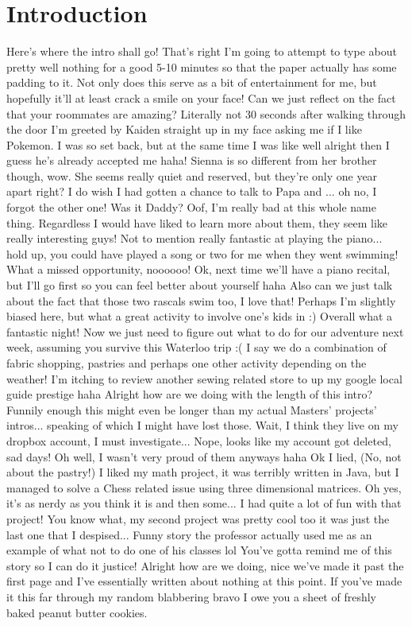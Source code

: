 \documentclass[]{article}
\begin{document}
\section{Introduction}
Here's where the intro shall go! That's right I'm going to attempt to type about pretty well nothing for a good 5-10 minutes so that the paper actually has some padding to it. Not only does this serve as a bit of entertainment for me, but hopefully it'll at least crack a smile on your face! Can we just reflect on the fact that your roommates are amazing? Literally not 30 seconds after walking through the door I'm greeted by Kaiden straight up in my face asking me if I like Pokemon. I was so set back, but at the same time I was like well alright then I guess he's already accepted me haha! Sienna is so different from her brother though, wow. She seems really quiet and reserved, but they're only one year apart right? I do wish I had gotten a chance to talk to Papa and ... oh no, I forgot the other one! Was it Daddy? Oof, I'm really bad at this whole name thing. Regardless I would have liked to learn more about them, they seem like really interesting guys! Not to mention really fantastic at playing the piano... hold up, you could have played a song or two for me when they went swimming! What a missed opportunity, noooooo! Ok, next time we'll have a piano recital, but I'll go first so you can feel better about yourself haha Also can we just talk about the fact that those two rascals swim too, I love that! Perhaps I'm slightly biased here, but what a great activity to involve one's kids in :) Overall what a fantastic night! Now we just need to figure out what to do for our adventure next week, assuming you survive this Waterloo trip :( I say we do a combination of fabric shopping, pastries and perhaps one other activity depending on the weather! I'm itching to review another sewing related store to up my google local guide prestige haha Alright how are we doing with the length of this intro? Funnily enough this might even be longer than my actual Masters' projects' intros... speaking of which I might have lost those. Wait, I think they live on my dropbox account, I must investigate... Nope, looks like my account got deleted, sad days! Oh well, I wasn't very proud of them anyways haha Ok I lied, (No, not about the pastry!) I liked my math project, it was terribly written in Java, but I managed to solve a Chess related issue using three dimensional matrices. Oh yes, it's as nerdy as you think it is and then some... I had quite a lot of fun with that project! You know what, my second project was pretty cool too it was just the last one that I despised... Funny story the professor actually used me as an example of what not to do one of his classes lol You've gotta remind me of this story so I can do it justice! Alright how are we doing, nice we've made it past the first page and I've essentially written about nothing at this point. If you've made it this far through my random blabbering bravo I owe you a sheet of freshly baked peanut butter cookies.
\end{document}

